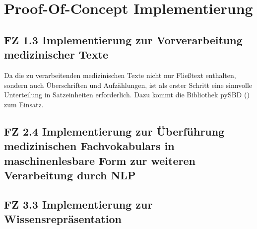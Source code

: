 \chapter{Proof-Of-Concept Implementierung}
\label{ch:implementierung}


\section{FZ 1.3 Implementierung zur Vorverarbeitung medizinischer Texte}
\label{sec:FZ1.3} 

Da die zu verarbeitenden medizinischen Texte nicht nur Fließtext enthalten, sondern auch Überschriften und Aufzählungen, ist als erster Schritt eine sinnvolle Unterteilung in Satzeinheiten erforderlich. Dazu kommt die Bibliothek pySBD (\cite{sadvilkar_pysbd_2020}) zum Einsatz.

\section{FZ 2.4 Implementierung zur Überführung medizinischen Fachvokabulars in maschinenlesbare Form zur weiteren Verarbeitung durch NLP}
\label{sec:FZ2.4} 

\section{FZ 3.3 Implementierung zur Wissensrepräsentation}
\label{sec:FZ3.3} 

